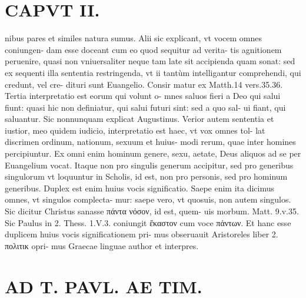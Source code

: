 \documentclass{article}
\begin{document}
\begin{pages}
\section*{CAPVT II. }
\marginpar{[ p.55 ]}\pstart nibus pares et similes natura sumus. Alii sic explicant, vt vocem omnes coniungen- dam esse doceant cum eo quod sequitur ad verita- tis agnitionem peruenire, quasi non vniuersaliter neque tam late sit accipienda quam sonat: sed ex sequenti illa sententia restringenda, vt ii tantùm intelligantur comprehendi, qui credunt, vel cre- dituri sunt Euangelio. Consir matur ex Matth.14 vers.35.36.  \pend\pstart Tertia interpretatio est eorum qui volunt o- mnes saluos fieri a Deo qui salui fiunt: quasi hic non definiatur, qui salui futuri sint: sed a quo sal- ui fiant, qui saluantur. Sic nonnunquam explicat Augustinus.  \pend\pstart Verior autem sententia et iustior, meo quidem iudicio, interpretatio est haec, vt vox omnes tol- lat discrimen ordinum, nationum, sexuum et huius- modi rerum, quae inter homines percipiuntur. Ex omni enim hominum genere, sexu, aetate, Deus aliquos ad se per Euangelium vocat. Itaque  non pro singulis generum accipitur, sed pro generibus singulorum vt loquuntur in Scholis, id est, non pro personis, sed pro hominum generibus.  \pend\pstart Duplex est enim huius vocis significatio. Saepe enim ita dicimus omnes, vt singulos complecta- mur: saepe vero, vt quosuis, non autem singulos. Sic dicitur Christus sanasse πάντα νόσον, id est, quem- uis morbum. Matt. 9.v.35. Sic Paulus in 2. Thess. 1.V.3. coniungit ἕκαστον cum voce πἀντων. Et hanc esse duplicem huius vocis significationem pri- mus obseruauit Aristoreles liber  2. πολιτικ opri- mus Graecae linguae author et interpres.  \pend
\section*{AD T. PAVL. AE TIM. }
\marginpar{[ p.56 ]}
{}

\end{pages}
\end{document}
